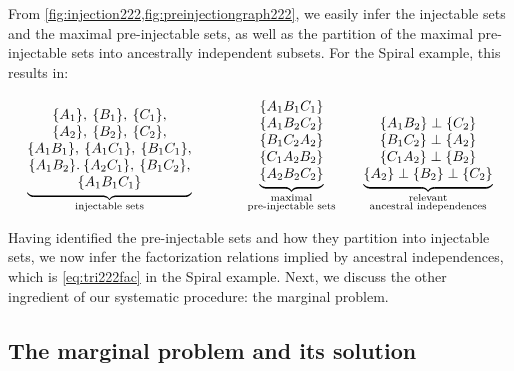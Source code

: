 \documentclass[aps,english,superscriptaddress,onecolumn,twoside,longbibliography,pra,floatfix,fleqn,nofootinbib]{revtex4-1}%
\theoremstyle{definition}
\newcounter{example}[section]
\newcommand{\aindep}{\perp} %
\DeclarePairedDelimiter{\braces}{\lbrace}{\rbrace}
\newcommand{\brackets}[1]{\braces*{#1}}
\begin{document}
From \cref{fig:injection222,fig:preinjectiongraph222}, we easily infer the injectable sets and the maximal pre-injectable sets, as well as the partition of the maximal pre-injectable sets into ancestrally independent subsets. For the Spiral example, this results in:
\begin{align}\label{eq:basicsetup222}
{\underbrace{\begin{matrix}
\, \\
\brackets{A_1},\:\brackets{B_1},\:\brackets{C_1},\\
\brackets{A_2},\:\brackets{B_2},\:\brackets{C_2},\\
\brackets{A_1 B_1},\:\brackets{A_1 C_1},\:\brackets{B_1 C_1},\\
\brackets{A_1 B_2}.\:\brackets{A_2 C_1},\:\brackets{B_1 C_2},\\
\brackets{A_1 B_1 C_1}
\end{matrix}}_{\substack{\text{injectable sets}}}}
\qquad\qquad
{\underbrace{\begin{matrix}
\brackets{A_1 B_1 C_1} \\
\brackets{A_1 B_2 C_2} \\
\brackets{B_1 C_2 A_2} \\
\brackets{C_1 A_2 B_2} \\
\brackets{A_2 B_2 C_2}
\end{matrix}}_{\substack{\text{maximal}\\\text{pre-injectable sets}}}}
\qquad
{\underbrace{\begin{matrix}
\\
\{A_1 B_2\} \aindep \{ C_2\} \\
\{B_1 C_2\} \aindep \{ A_2\} \\
\{C_1 A_2\} \aindep \{ B_2\} \\
\{A_2\} \aindep \{B_2\} \aindep \{ C_2\}
\end{matrix}}_{\substack{\text{relevant}\\\text{ancestral independences}}}}
\end{align}

Having identified the pre-injectable sets and how they partition into injectable sets, we now infer the factorization relations implied by ancestral independences, which is \cref{eq:tri222fac} in the Spiral example. Next, we discuss the other ingredient of our systematic procedure: the marginal problem.

\subsection{The marginal problem and its solution}
\label{step:marginalsproblem}
\end{document}
